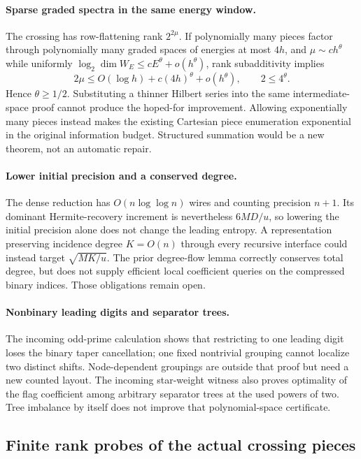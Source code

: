 \paragraph{Sparse graded spectra in the same energy window.}
The crossing has row-flattening rank $2^{2\mu}$. If polynomially many
pieces factor through polynomially many graded spaces of energies at
most $4h$, and
$\mu\sim c h^\theta$ while uniformly
$\log_2\dim W_E\le cE^\theta+o(h^\theta)$, rank subadditivity implies
\[
 2\mu\le O(\log h)+c(4h)^\theta+o(h^\theta),
 \qquad 2\le4^\theta.
\]
Hence $\theta\ge1/2$. Substituting a thinner Hilbert series into the
same intermediate-space proof cannot produce the hoped-for improvement.
Allowing exponentially many pieces instead makes the existing Cartesian
piece enumeration exponential in the original information budget.
Structured summation would be a new theorem, not an automatic repair.

\paragraph{Lower initial precision and a conserved degree.}
The dense reduction has $O(n\log\log n)$ wires and counting precision
$n+1$. Its dominant Hermite-recovery increment is nevertheless
$6MD/u$, so lowering the initial precision alone does not change the
leading entropy. A representation preserving incidence degree $K=O(n)$
through every recursive interface could instead target
$\sqrt{MK/u}$. The prior degree-flow lemma correctly conserves total
degree, but does not supply efficient local coefficient queries on the
compressed binary indices. Those obligations remain open.

\paragraph{Nonbinary leading digits and separator trees.}
The incoming odd-prime calculation shows that restricting to one leading
digit loses the binary taper cancellation; one fixed nontrivial grouping
cannot localize two distinct shifts. Node-dependent groupings are outside
that proof but need a new counted layout. The incoming star-weight witness
also proves optimality of the flag coefficient among arbitrary separator
trees at the used powers of two. Tree imbalance by itself does not improve
that polynomial-space certificate.

\subsection{Finite rank probes of the actual crossing pieces}

